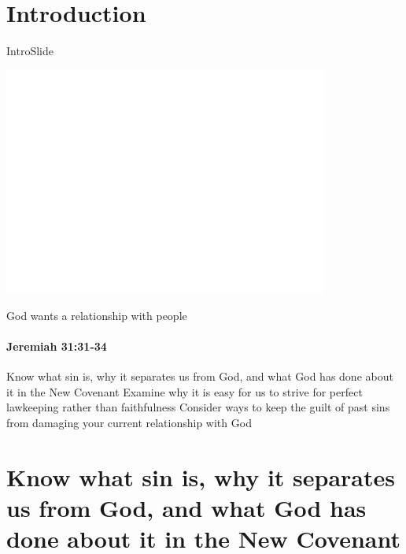 
\section{Introduction}

\begin{frame}{IntroSlide}
\begin{center}
	\includegraphics[draft, width=0.8\textwidth]{figures/dummy.png}
\end{center}

\end{frame}

\begin{frame}{God wants a relationship with people}
\framesubtitle{Jeremiah 31:31-34}
	
\end{frame}

\begin{goals}
\goal Know what sin is, why it separates us from God, and what God has done about it in the New Covenant
\goal Examine why it is easy for us to strive for perfect lawkeeping rather than faithfulness
\goal Consider ways to keep the guilt of past sins from damaging your current relationship with God

\end{goals}

\section{Know what sin is, why it separates us from God, and what God has done about it in the New Covenant}

